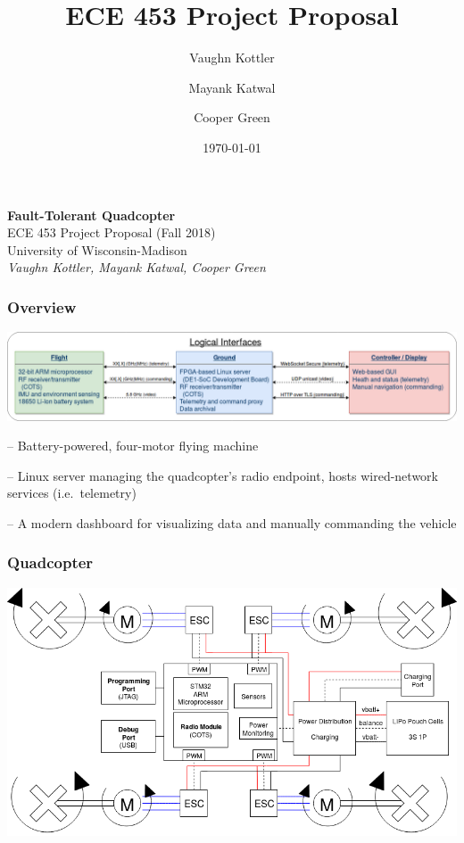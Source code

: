 \documentclass{beamer}
\title{ECE 453 Project Proposal}
\author{Vaughn Kottler}
\author{Mayank Katwal}
\author{Cooper Green}
\date{\today}
\begin{document}
\begin{frame}
\begin{center}
{\Large\textbf{Fault-Tolerant Quadcopter}}\\
\vspace{\baselineskip}
ECE 453 Project Proposal (Fall 2018)\\
University of Wisconsin-Madison\\
\vspace{\baselineskip}
{\large\textit{Vaughn Kottler, Mayank Katwal, Cooper Green}}
\end{center}
\end{frame}

\begin{frame}
\frametitle{Overview}
\begin{center}
\includegraphics[width=\linewidth]{../src/im/top_level}
\end{center}
\vspace{\baselineskip}
\begin{description}[align=right,labelwidth=80pt,itemsep=10pt]
\item [Quadcopter] -- Battery-powered, four-motor flying machine
\item [Ground Station] -- Linux server managing the quadcopter's
	radio endpoint, hosts wired-network services (i.e.\ telemetry)
\item [Web-based UI] -- A modern dashboard for visualizing data
	and manually commanding the vehicle
\end{description}
\end{frame}

\begin{frame}
\frametitle{Quadcopter}
\begin{center}
\includegraphics[width=\linewidth]{../src/im/quadcopter}
\end{center}
\end{frame}
\end{document}

